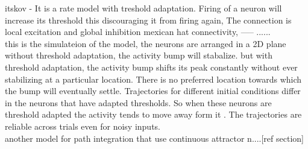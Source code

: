 itskov  - It is a rate model with treshold adaptation. Firing of a neuron will increase its threshold this discouraging it from firing again, The connection is local excitation and global inhibition mexican hat connectivity, ----- ......\\
this is the simulateion of the model, the neurons are arranged in a  2D plane without threshold adaptation, the activity bump will stabalize. but with threshold adaptation, the activity bump shifts its peak constantly without ever stabilizing at a particular location. There is no preferred location towards which the bump will eventually settle. Trajectories for different initial conditions differ in the neurons that have adapted thresholds. So when these neurons are threshold adapted the activity tends to move away form it . The trajectories are reliable across trials even for noisy inputs. \\ another model for path integration that use continuous attractor n....[ref section]
